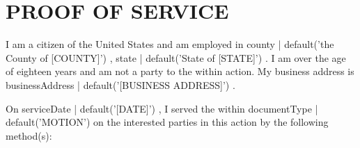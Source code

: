 
\section*{PROOF OF SERVICE}

I am a citizen of the United States and am employed in {{ county | default('the County of [COUNTY]') }}, {{ state | default('State of [STATE]') }}. I am over the age of eighteen years and am not a party to the within action. My business address is {{ businessAddress | default('[BUSINESS ADDRESS]') }}.

On {{ serviceDate | default('[DATE]') }}, I served the within {{ documentType | default('MOTION') }} on the interested parties in this action by the following method(s):

